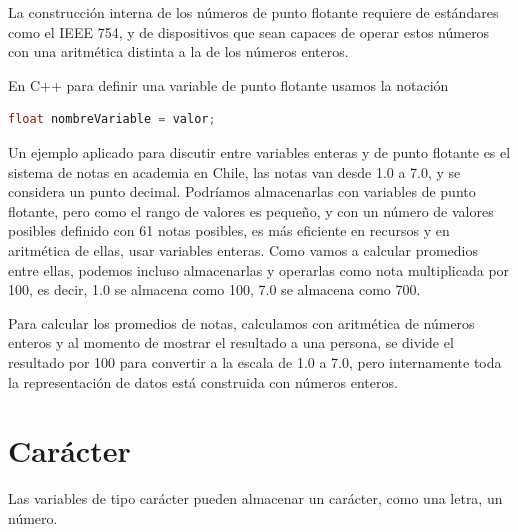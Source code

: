 \documentclass[../principal.tex]{subfiles}
\begin{document}
La construcción interna de los números de punto flotante requiere de estándares como el IEEE 754, y de dispositivos que sean capaces de operar estos números con una aritmética distinta a la de los números enteros.

En C++ para definir una variable de punto flotante usamos la notación

\begin{lstlisting}[language=C++]
float nombreVariable = valor;
\end{lstlisting}

Un ejemplo aplicado para discutir entre variables enteras y de punto flotante es el sistema de notas en academia en Chile, las notas van desde 1.0 a 7.0, y se considera un punto decimal. Podríamos almacenarlas con variables de punto flotante, pero como el rango de valores es pequeño, y con un número de valores posibles definido con 61 notas posibles, es más eficiente en recursos y en aritmética de ellas, usar variables enteras. Como vamos a calcular promedios entre ellas, podemos incluso almacenarlas y operarlas como nota multiplicada por 100, es decir, 1.0 se almacena como 100, 7.0 se almacena como 700.

Para calcular los promedios de notas, calculamos con aritmética de números enteros y al momento de mostrar el resultado a una persona, se divide el resultado por 100 para convertir a la escala de 1.0 a 7.0, pero internamente toda la representación de datos está construida con números enteros.

\section{Carácter}

Las variables de tipo carácter pueden almacenar un carácter, como una letra, un número.

\newpage
\end{document}
